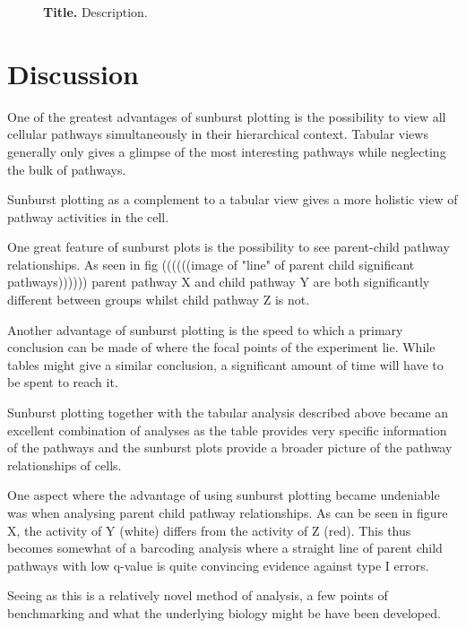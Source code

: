 \documentclass[11pt]{article}
\renewcommand{\includegraphics}[2][]{}
\begin{document}
\begin{figure}[htp]
\begin{center}
\caption{\label{fig:id-stats} {\bf Title.} Description.}
\end{center}
\end{figure}

\section*{Discussion}
  One of the greatest advantages of sunburst plotting is the possibility to view all cellular pathways simultaneously in their hierarchical context. Tabular views generally only gives a glimpse of the most interesting pathways while neglecting the bulk of pathways.

  Sunburst plotting as a complement to a tabular view gives a more holistic view of pathway activities in the cell.

  One great feature of sunburst plots is the possibility to see parent-child pathway relationships. As seen in fig  ((((((image of "line" of parent child significant pathways)))))) parent pathway X and child pathway Y are both significantly different between groups whilst child pathway Z is not.


  Another advantage of sunburst plotting is the speed to which a primary conclusion can be made of where the focal points of the experiment lie. While tables might give a similar conclusion, a significant amount of time will have to be spent to reach it.

  Sunburst plotting together with the tabular analysis described above became an excellent combination of analyses as the table provides very specific information of the pathways and the sunburst plots provide a broader picture of the pathway relationships of cells.

  One aspect where the advantage of using sunburst plotting became undeniable was when analysing parent child pathway relationships. As can be seen in figure X, the activity of Y (white) differs from the activity of Z (red). This thus becomes somewhat of a barcoding analysis where a straight line of parent child pathways with low q-value is quite convincing evidence against type I errors.

  Seeing as this is a relatively novel method of analysis, a few points of benchmarking and what the underlying biology might be have been developed.
\end{document}
